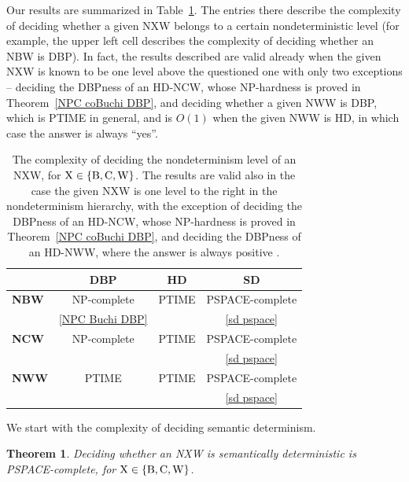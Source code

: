 \documentclass[10pt,a4paper]{amsart}
\newtheorem{thm}{Theorem}[section]
\theoremstyle{definition}
\numberwithin{equation}{section}
\newcommand{\nxw}{NXW\xspace}
\begin{document}
 
Our results are summarized in Table~\ref{level}. The entries there describe the complexity of deciding whether a given \nxw belongs to a certain nondeterministic level (for example, the upper left cell describes the complexity of deciding whether an NBW is DBP). In fact, the results described are valid already when the given \nxw is known to be one level above the questioned one with only two exceptions -- deciding the DBPness of an HD-NCW, whose NP-hardness is proved in Theorem~\ref{NPC coBuchi DBP}, and deciding whether a given NWW is DBP, which is PTIME in general, and is $O(1)$ when the given NWW is HD, in which case the answer is always ``yes''. 
\begin{table}[ht!] %
	\begin{center}
		\label{tab:table1}
		\begin{tabular}{lccc}
							&\textbf{DBP}				& \textbf{HD} 		& \textbf{SD}			\\
			\midrule 
			\textbf{NBW} 	& NP-complete 				& PTIME 			& PSPACE-complete	 	\\
							& \autoref{NPC Buchi DBP}	& \cite{BK18} 		& \autoref{sd pspace}	\\
			\midrule
			\textbf{NCW} 	& NP-complete 				& PTIME 			& PSPACE-complete 		\\
							& \cite{KM18}				& \cite{KS15}	 	& \autoref{sd pspace}	\\
			\midrule
			\textbf{NWW}	& PTIME 					& PTIME 			& PSPACE-complete 		\\
							& \cite{KS15,BK18}			& \cite{KS15,BK18} 	& \autoref{sd pspace}	\\
		\end{tabular}
	\end{center}
	\caption{The complexity of deciding the nondeterminism level of an \nxw, for ${\rm X} \in \{{\rm B,C,W}\}$. 
		The results are valid also in the case the given \nxw is one level to the right in the nondeterminism hierarchy, with the exception of deciding the DBPness of an HD-NCW, whose NP-hardness is proved in Theorem~\ref{NPC coBuchi DBP}, and deciding the DBPness of an HD-NWW, where the answer is always positive \cite{BKS17}.}
	\label{level}
\end{table}

We start with the complexity of deciding semantic determinism. 

\begin{thm}
\label{sd pspace}
Deciding whether an \nxw is semantically deterministic is PSPACE-complete, for ${\rm X} \in \{{\rm B,C,W}\}$.
\end{thm}
\end{document}
